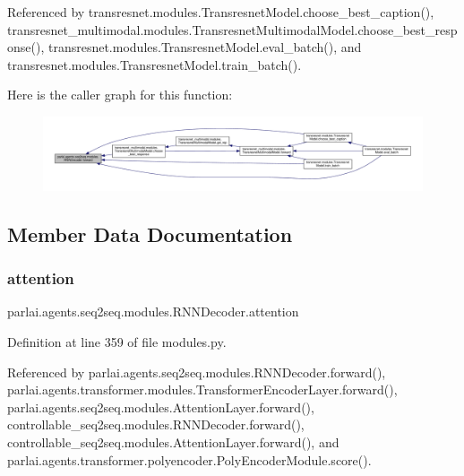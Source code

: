 Referenced by transresnet.\+modules.\+Transresnet\+Model.\+choose\+\_\+best\+\_\+caption(), transresnet\+\_\+multimodal.\+modules.\+Transresnet\+Multimodal\+Model.\+choose\+\_\+best\+\_\+response(), transresnet.\+modules.\+Transresnet\+Model.\+eval\+\_\+batch(), and transresnet.\+modules.\+Transresnet\+Model.\+train\+\_\+batch().

Here is the caller graph for this function\+:
\nopagebreak
\begin{figure}[H]
\begin{center}
\leavevmode
\includegraphics[width=350pt]{classparlai_1_1agents_1_1seq2seq_1_1modules_1_1RNNDecoder_a883315b7f0f57ccf17c96fc8f24ddc11_icgraph}
\end{center}
\end{figure}


\subsection{Member Data Documentation}
\mbox{\label{classparlai_1_1agents_1_1seq2seq_1_1modules_1_1RNNDecoder_a28ca5ae00c8d57bb952a8c4f477da2db}} 
\subsubsection{\texorpdfstring{attention}{attention}}
{\footnotesize\ttfamily parlai.\+agents.\+seq2seq.\+modules.\+R\+N\+N\+Decoder.\+attention}



Definition at line 359 of file modules.\+py.



Referenced by parlai.\+agents.\+seq2seq.\+modules.\+R\+N\+N\+Decoder.\+forward(), parlai.\+agents.\+transformer.\+modules.\+Transformer\+Encoder\+Layer.\+forward(), parlai.\+agents.\+seq2seq.\+modules.\+Attention\+Layer.\+forward(), controllable\+\_\+seq2seq.\+modules.\+R\+N\+N\+Decoder.\+forward(), controllable\+\_\+seq2seq.\+modules.\+Attention\+Layer.\+forward(), and parlai.\+agents.\+transformer.\+polyencoder.\+Poly\+Encoder\+Module.\+score().

